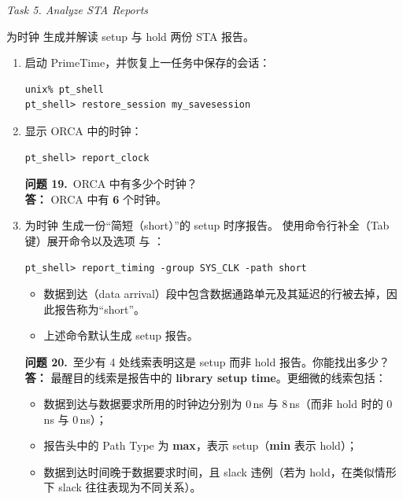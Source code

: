 \noindent\textit{Task 5. Analyze STA Reports}

为时钟  生成并解读 setup 与 hold 两份 STA 报告。

\begin{enumerate}
  \item 启动 PrimeTime，并恢复上一任务中保存的会话：
\begin{lstlisting}
unix% pt_shell
pt_shell> restore_session my_savesession
\end{lstlisting}

  \item 显示 ORCA 中的时钟：
\begin{lstlisting}
pt_shell> report_clock
\end{lstlisting}

\begin{questionBox}
\textbf{问题 19.}\ ORCA 中有多少个时钟？\\[0.35em]
\textbf{答：} ORCA 中有 \textbf{6} 个时钟。
\end{questionBox}

  \item 为时钟  生成一份“简短（short）”的 setup 时序报告。
        使用命令行补全（Tab 键）展开命令以及选项  与 ：
\begin{lstlisting}
pt_shell> report_timing -group SYS_CLK -path short
\end{lstlisting}

\begin{noteBox}
\begin{itemize}
  \item 数据到达（data arrival）段中包含数据通路单元及其延迟的行被去掉，因此报告称为“short”。
  \item 上述命令默认生成 setup 报告。
\end{itemize}
\end{noteBox}

\begin{questionBox}
\textbf{问题 20.}\ 至少有 4 处线索表明这是 setup 而非 hold 报告。你能找出多少？\\[0.35em]
\textbf{答：} 最醒目的线索是报告中的 \textbf{library setup time}。更细微的线索包括：
\begin{itemize}
  \item 数据到达与数据要求所用的时钟边分别为 0\,ns 与 8\,ns（而非 hold 时的 0\,ns 与 0\,ns）；
  \item 报告头中的 Path Type 为 \textbf{max}，表示 setup（\textbf{min} 表示 hold）；
  \item 数据到达时间晚于数据要求时间，且 slack 违例（若为 hold，在类似情形下 slack 往往表现为不同关系）。
\end{itemize}


\end{questionBox}
\end{enumerate}
